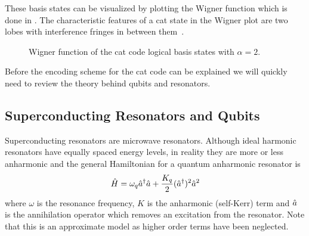 \documentclass[main.tex]{subfiles}
\begin{document}
These basis states can be visualized by plotting the Wigner function which is done in . The characteristic features of a cat state in the Wigner plot are two lobes with interference fringes in between them~\cite{girvin_schrodinger_2017}.

\begin{figure}[H]
	\centering
	\caption{%
	Wigner function of the cat code logical basis states with \(\alpha = 2\).
	}%
	\label{fig:cat-code-basis-wigner}
\end{figure}

Before the encoding scheme for the cat code can be explained we will quickly need to review the theory behind qubits and resonators.

\subsection{Superconducting Resonators and Qubits}
Superconducting resonators are microwave resonators.
Although ideal harmonic resonators have equally spaced energy levels, in reality they are more or less anharmonic and the general Hamiltonian for a quantum anharmonic resonator is
\begin{equation}
    \hat{H} = \omega_{q} \hat{a}^\dagger\hat{a} + \frac{K_q}{2} (\hat{a}^\dagger)^2\hat{a}^2
    \label{eq:resonator-hamiltonian}
\end{equation}
where \( \omega \) is the resonance frequency, \( K \) is the anharmonic (self-Kerr) term and \(\hat{a}\) is the annihilation operator which removes an excitation from the resonator.
Note that this is an approximate model as higher order terms have been neglected.
\end{document}
